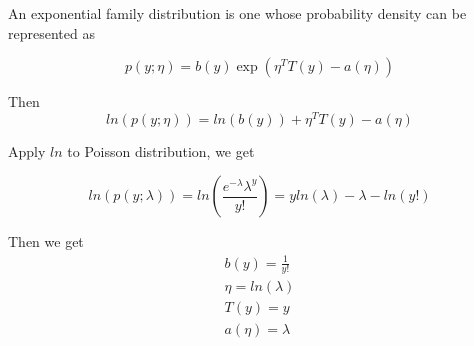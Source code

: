 \begin{answer}

An exponential family distribution is one whose probability density
can be represented as

\begin{equation*}
    p(y; \eta) = b(y)\exp(\eta^TT(y) - a(\eta))
\end{equation*}

Then 
\begin{equation*}
   ln\left( p(y; \eta) \right) = ln\left(b(y)\right) + \eta^TT(y) - a(\eta)
\end{equation*}

Apply $ln$ to Poisson distribution, we get 

\begin{equation*}
  ln\left(p(y; \lambda)\right) =  ln\left( \frac{e^{-\lambda}\lambda^y}{y!} \right) = yln(\lambda) - \lambda - ln(y!)
\end{equation*}

Then we get 
\begin{align*}
  b(y) = \frac{1}{y!} \\
  \eta = ln(\lambda) \\
  T(y) = y \\
  a(\eta) = \lambda
\end{align*}



\end{answer}
